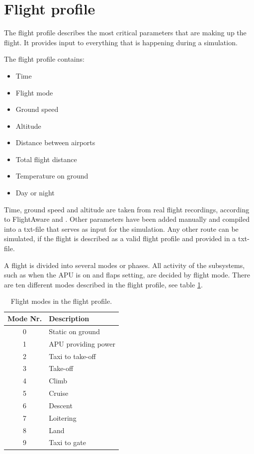 \documentclass[english]{kththesis}
\begin{document}
\section{Flight profile}
\label{sec:flightprofile}
The flight profile describes the most critical parameters that are making up the flight. It provides input to everything that is happening during a simulation.

The flight profile contains:

\begin{itemize}
  \item Time
  \item Flight mode
  \item Ground speed
  \item Altitude
  \item Distance between airports
  \item Total flight distance
  \item Temperature on ground
  \item Day or night
\end{itemize}

Time, ground speed and altitude are taken from real flight recordings, according to FlightAware \cite{flightaware} and \cite{flightaware2}. Other parameters have been added manually and compiled into a txt-file that serves as input for the simulation. Any other route can be simulated, if the flight is described as a valid flight profile and provided in a txt-file.

A flight is divided into several modes or phases. All activity of the subsystems, such as when the APU is on and flaps setting, are decided by flight mode. There are ten different modes described in the flight profile, see table \ref{table:FlightModes}.

\begin{table}[h!]
\centering
\caption{Flight modes in the flight profile.}
\begin{tabular}{ c | l }
 Mode Nr. & Description \\ 
 \hline
 \hline
 0 & Static on ground\\  
 1 & APU providing power \\
 2 & Taxi to take-off \\
 3 & Take-off \\
 4 & Climb \\
 5 & Cruise \\
 6 & Descent \\
 7 & Loitering \\
 8 & Land \\
 9 & Taxi to gate\\
\end{tabular}
\label{table:FlightModes}
\end{table}
\end{document}
